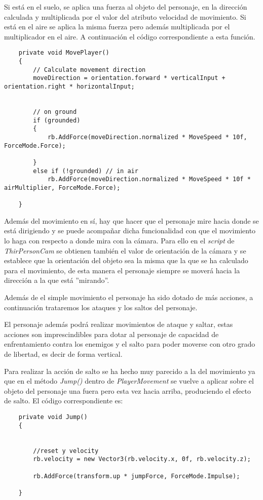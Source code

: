 Si está en el suelo, se aplica una fuerza al objeto del personaje, en la dirección calculada y multiplicada por el valor del atributo velocidad de movimiento. Si está en el aire se aplica la misma fuerza pero además multiplicada por el multiplicador en el aire. A continuación el código correspondiente a esta función. 

\begin{lstlisting}
    private void MovePlayer()
    {
        // Calculate movement direction
        moveDirection = orientation.forward * verticalInput + orientation.right * horizontalInput;


        // on ground 
        if (grounded) 
        { 
            rb.AddForce(moveDirection.normalized * MoveSpeed * 10f, ForceMode.Force);

        }
        else if (!grounded) // in air
            rb.AddForce(moveDirection.normalized * MoveSpeed * 10f * airMultiplier, ForceMode.Force);

    }
    \end{lstlisting}

    Además del movimiento en sí, hay que hacer que el personaje mire hacia donde se está dirigiendo y se puede acompañar dicha funcionalidad con que el movimiento lo haga con respecto a donde mira con la cámara. Para ello en el \textit{script} de \textit{ThirPersonCam} se obtienen también el valor de orientación de la cámara y se establece que la orientación del objeto sea la misma que la que se ha calculado para el movimiento, de esta manera el personaje siempre se moverá hacia la dirección a la que está ''mirando''.

    Además de el simple movimiento el personaje ha sido dotado de más acciones, a continuación trataremos los ataques y los saltos del personaje.

    El personaje además podrá realizar movimientos de ataque y saltar, estas acciones son imprescindibles para dotar al personaje de capacidad de enfrentamiento contra los enemigos y el salto para poder moverse con otro grado de libertad, es decir de forma vertical.

    Para realizar la acción de salto se ha hecho muy parecido a la del movimiento ya que en el método \textit{Jump()} dentro de \textit{PlayerMovement} se vuelve a aplicar sobre el objeto del personaje una fuera pero esta vez hacia arriba, produciendo el efecto de salto. El código correspondiente es: 
    
\begin{lstlisting}
    private void Jump()
    {

        
        //reset y velocity
        rb.velocity = new Vector3(rb.velocity.x, 0f, rb.velocity.z);

        rb.AddForce(transform.up * jumpForce, ForceMode.Impulse);
       
    }
\end{lstlisting}

